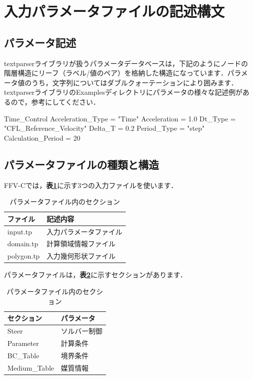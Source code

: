 \graphicspath{{./fig_Param/}}

%
\section{入力パラメータファイルの記述構文}
%
\subsection{パラメータ記述}
textparserライブラリが扱うパラメータデータベースは，下記のようにノードの階層構造にリーフ（ラベル/値のペア）を格納した構造になっています．パラメータ値のうち，文字列についてはダブルクォーテーションにより囲みます．
textparserライブラリのExamplesディレクトリにパラメータの様々な記述例があるので，参考にしてください．

{
\small 
\begin{program}
  Time_Control {
    Acceleration_Type  = "Time"
    Acceleration       = 1.0
    Dt_Type            = "CFL_Reference_Velocity"
    Delta_T            = 0.2
    Period_Type        = "step"
    Calculation_Period = 20
  }
\end{program}
}


%
\subsection{パラメータファイルの種類と構造}
FFV-Cでは，\textbf{表\ref{tbl:input_files}}に示す3つの入力ファイルを使います．

\begin{table}[htdp]
\caption{パラメータファイル内のセクション}
\begin{center}
\small
\begin{tabular}{ll} \toprule
ファイル & 記述内容\\ \midrule
input.tp & 入力パラメータファイル\\
domain.tp & 計算領域情報ファイル\\ 
polygon.tp & 入力幾何形状ファイル\\ \bottomrule
\end{tabular}
\end{center}
\label{tbl:input_files}
\end{table}


パラメータファイルは，\textbf{表\ref{tbl:param_tag}}に示すセクションがあります．


\begin{table}[htdp]
\caption{パラメータファイル内のセクション}
\begin{center}
\small
\begin{tabular}{ll} \toprule
セクション & パラメータ\\ \midrule
Steer & ソルバー制御\\
Parameter & 計算条件\\
BC\_Table & 境界条件\\
Medium\_Table & 媒質情報\\ \bottomrule
\end{tabular}
\end{center}
\label{tbl:param_tag}
\end{table}


